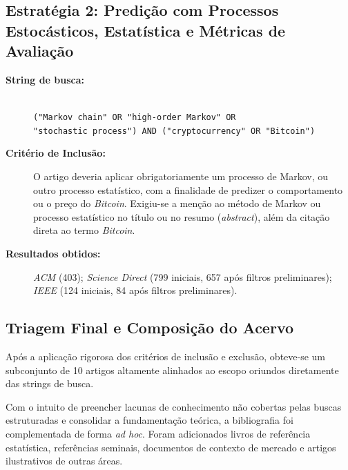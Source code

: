 \documentclass[
    12pt,                %
    openright,           %
    oneside,             %
    a4paper,             %
    english,             %
    brazil               %
]{abntex2}
\begin{document}
\subsection{Estratégia 2: Predição com Processos Estocásticos, Estatística e Métricas de Avaliação}
\begin{description}
    \item[\textbf{String de busca:}] \hfill \\
    \texttt{("Markov chain" OR "high-order Markov" OR} \\
    \texttt{"stochastic process") AND ("cryptocurrency" OR "Bitcoin")}
    \item[\textbf{Critério de Inclusão:}] O artigo deveria aplicar obrigatoriamente um processo de Markov, ou outro processo estatístico, com a finalidade de predizer o comportamento ou o preço do \textit{Bitcoin}. Exigiu-se a menção ao método de Markov ou processo estatístico no título ou no resumo (\textit{abstract}), além da citação direta ao termo \textit{Bitcoin}.
    \item[\textbf{Resultados obtidos:}] \textit{ACM} (403); \textit{Science Direct} (799 iniciais, 657 após filtros preliminares); \textit{IEEE} (124 iniciais, 84 após filtros preliminares).
\end{description}

\subsection{Triagem Final e Composição do Acervo}
Após a aplicação rigorosa dos critérios de inclusão e exclusão, obteve-se um subconjunto de 10 artigos altamente alinhados ao escopo oriundos diretamente das strings de 
busca.

Com o intuito de preencher lacunas de conhecimento não cobertas pelas buscas estruturadas e consolidar a fundamentação teórica, a bibliografia foi complementada de 
forma \textit{ad hoc}. Foram adicionados livros de referência estatística, referências seminais, documentos de contexto de mercado e artigos ilustrativos de outras áreas. 
\end{document}
